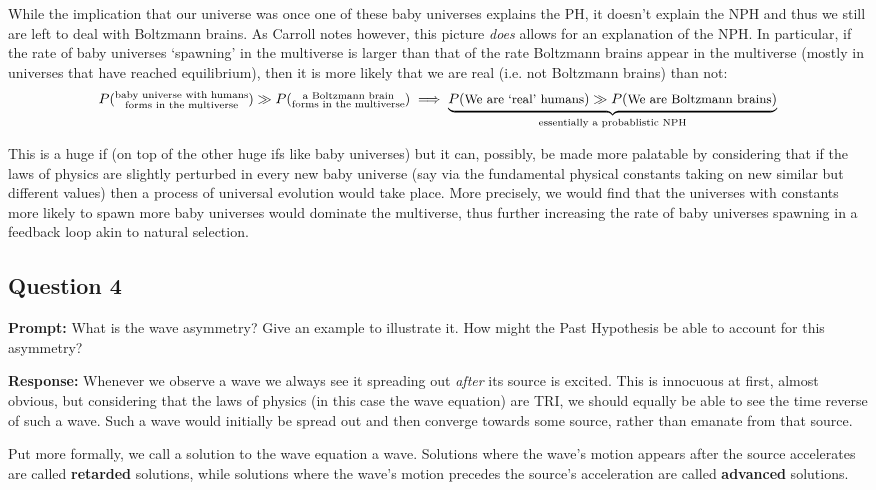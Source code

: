 \documentclass{article}
\begin{document}
While the implication that our universe was once one of these baby universes explains the PH, it doesn't explain the NPH and thus we still are left to deal with Boltzmann brains. As Carroll notes however, this picture \textit{does} allows for an explanation of the NPH. In particular, if the rate of baby universes `spawning' in the multiverse is larger than that of the rate Boltzmann brains appear in the multiverse (mostly in universes that have reached equilibrium), then it is more likely that we are real (i.e. not Boltzmann brains) than not:
$$P(\substack{\text{baby universe with humans}\\\text{forms in the multiverse}})\gg P(\substack{\text{a Boltzmann brain}\\\text{forms in the multiverse}})\implies\underbrace{P(\text{\small We are `real' humans})\gg P(\text{\small We are Boltzmann brains})}_{\text{essentially a probablistic NPH}}$$

This is a huge if (on top of the other huge ifs like baby universes) but it can, possibly, be made more palatable by considering that if the laws of physics are slightly perturbed in every new baby universe (say via the fundamental physical constants taking on new similar but different values) then a process of universal evolution would take place. More precisely, we would find that the universes with constants more likely to spawn more baby universes would dominate the multiverse, thus further increasing the rate of baby universes spawning in a feedback loop akin to natural selection.

\subsection*{Question 4}
\noindent\textbf{Prompt:} What is the wave asymmetry? Give an example to illustrate it. How might the Past Hypothesis be able to account for this asymmetry?
\bigskip

\noindent\textbf{Response:} Whenever we observe a wave we always see it spreading out \textit{after} its source is excited. This is innocuous at first, almost obvious, but considering that the laws of physics (in this case the wave equation) are TRI, we should equally be able to see the time reverse of such a wave. Such a wave would initially be spread out and then converge towards some source, rather than emanate from that source.

Put more formally, we call a solution to the wave equation a wave. Solutions where the wave's motion appears after the source accelerates are called \textbf{retarded} solutions, while solutions where the wave's motion precedes the source's acceleration are called \textbf{advanced} solutions.
\end{document}
